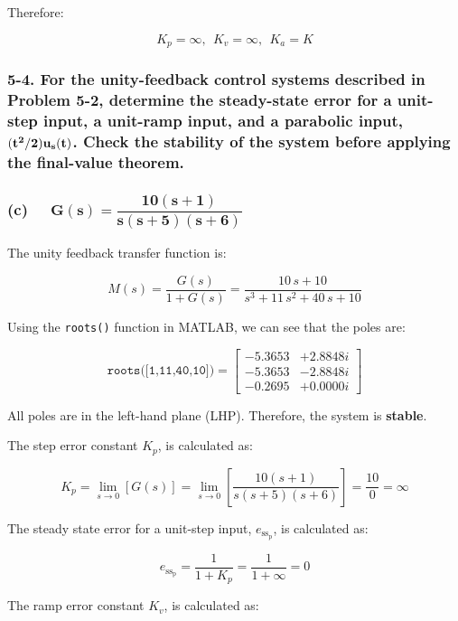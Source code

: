 \documentclass[12pt, letterpaper]{../assignment}
\begin{document}
Therefore:

\begin{answer}
    $$ K_p = \infty, \ \ K_v = \infty, \ \ K_a = K $$
\end{answer}

\subsubsection*{5-4. For the unity-feedback control systems described in Problem 5-2,
determine the steady-state error for a unit-step input,
a unit-ramp input, and a parabolic input, $\bold{(t^2/2)u_s(t)}$.
Check the stability of the system before applying the final-value theorem.}

\subsubsection*{(c) \ \  $ \mathbf{ G(s) = \dfrac{10(s + 1)}{s(s + 5)(s + 6)}}$}

The unity feedback transfer function is:

$$ M(s) = \frac{G(s)}{1+G(s)} = \frac{10\,s+10}{s^3+11\,s^2+40\,s+10} $$

Using the \texttt{roots()} function in MATLAB, we can see that the poles are:

$$ \texttt{roots([1,11,40,10])} = \left[ \begin{array}{cc} 
    -5.3653 &+ 2.8848i\\
    -5.3653 &- 2.8848i\\
    -0.2695 &+ 0.0000i
\end{array} \right] $$

\begin{answer}
All poles are in the left-hand plane (LHP). Therefore, the system is \textbf{stable}.
\end{answer}

The step error constant $K_p$, is calculated as:

$$ K_p = \lim_{s \to 0} \left[ G(s) \right]
       = \lim_{s \to 0} \left[ \frac{10(s + 1)}{s(s + 5)(s + 6)} \right]
       = \frac{10}{0}
       = \infty $$

The steady state error for a unit-step input, ${e_{\text{ss}_\text{p}}}$, is calculated as:

\begin{answer}
$$ {e_{\text{ss}_\text{p}}} = \frac{1}{1 + K_p} = \frac{1}{1 + \infty} = 0 $$
\end{answer}

The ramp error constant $K_v$, is calculated as:
\end{document}
